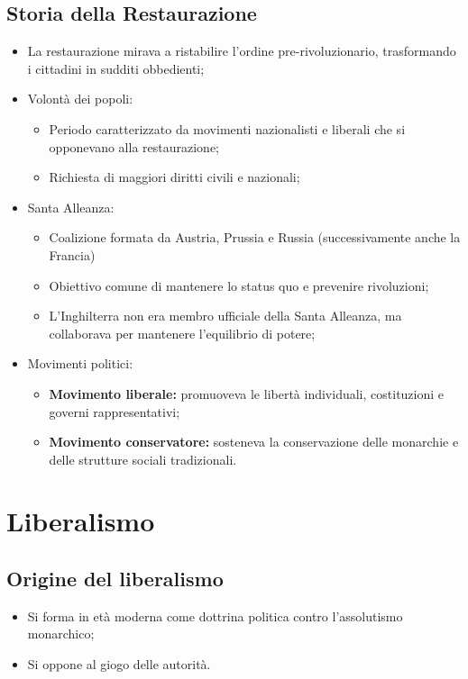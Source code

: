 \documentclass{article}
\begin{document}
\subsection{Storia della Restaurazione}
\begin{itemize}
    \item La restaurazione mirava a ristabilire l'ordine pre-rivoluzionario, trasformando i
        cittadini in sudditi obbedienti;
    \item Volontà dei popoli:
        \begin{itemize}
            \item Periodo caratterizzato da movimenti nazionalisti e liberali che si opponevano
                alla restaurazione;
            \item Richiesta di maggiori diritti civili e nazionali;
        \end{itemize}
    \item Santa Alleanza:
        \begin{itemize}
            \item Coalizione formata da Austria, Prussia e Russia (successivamente anche la
                Francia)
            \item Obiettivo comune di mantenere lo status quo e prevenire rivoluzioni;
            \item L'Inghilterra non era membro ufficiale della Santa Alleanza, ma collaborava
                per mantenere l'equilibrio di potere;
        \end{itemize}
    \item Movimenti politici:
        \begin{itemize}
            \item \textbf{Movimento liberale:} promuoveva le libertà individuali, costituzioni
                e governi rappresentativi;
            \item \textbf{Movimento conservatore:} sosteneva la conservazione delle monarchie
                e delle strutture sociali tradizionali.
        \end{itemize}
\end{itemize}

\section{Liberalismo}
\subsection{Origine del liberalismo}
\begin{itemize}
    \item Si forma in età moderna come dottrina politica contro l'assolutismo monarchico;
    \item Si oppone al giogo delle autorità.
\end{itemize}
\end{document}
